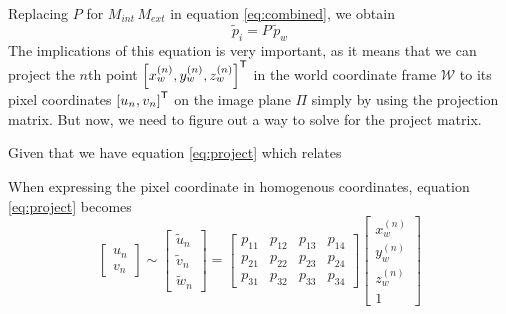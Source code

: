 Replacing $P$ for $M_{int}\,M_{ext}$ in equation \ref{eq:combined}, we obtain
\begin{equation} \label{eq:project}
    \widetilde{p}_{i} = P\,\widetilde{p}_{w}
\end{equation}
The implications of this equation is very important, as it means that we can project the $n$th point $\left[ x_w^{(n)}, y_w^{(n)}, z_w^{(n)} \right]^{\mathsf{T}}$ in the world coordinate frame $\mathcal{W}$ to its pixel coordinates $\left[ u_n, v_n \right]^{\mathsf{T}}$ on the image plane $\Pi$ simply by using the projection matrix. But now, we need to figure out a way to solve for the project matrix. 

Given that we have equation \ref{eq:project} which relates 



When expressing the pixel coordinate in homogenous coordinates, equation \ref{eq:project} becomes
\begin{equation}
    \begin{bmatrix}
        u_n \\ v_n
    \end{bmatrix}
    \sim
    \begin{bmatrix}
        \widetilde{u}_n \\ \widetilde{v}_n \\ \widetilde{w}_n
    \end{bmatrix}
    =
    \begin{bmatrix}
        p_{11} & p_{12} & p_{13} & p_{14} \\
        p_{21} & p_{22} & p_{23} & p_{24} \\
        p_{31} & p_{32} & p_{33} & p_{34}
    \end{bmatrix}
    \begin{bmatrix}
        x_w^{(n)} \\ y_w^{(n)} \\ z_w^{(n)} \\ 1
    \end{bmatrix}
\end{equation}
